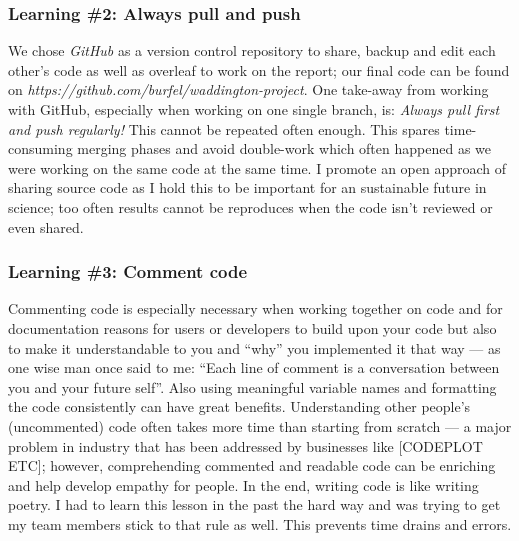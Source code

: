 \documentclass[journal, a4paper]{IEEEtran}
\begin{document}
\subsubsection{Learning \#2: Always pull and push}
We chose \textit{GitHub} as a version control repository to share, backup and edit each other’s code as well as overleaf to work on the report; our final code can be found on \textit{https://github.com/burfel/waddington-project}. One take-away from working with GitHub, especially when working on one single branch, is: \textit{Always pull first and push regularly!} This cannot be repeated often enough. This spares time-consuming merging phases and avoid double-work which often happened as we were working on the same code at the same time. 
I promote an open approach of sharing source code as I hold this to be important for an sustainable future in science; too often results cannot be reproduces when the code isn’t reviewed or even shared.

\hfill
\subsubsection{Learning \#3: Comment code}
Commenting code is especially necessary when working together on code and for documentation reasons for users or developers to build upon your code but also to make it understandable to you and “why” you implemented it that way — as one wise man once said to me: “Each line of comment is a conversation between you and your future self”. Also using meaningful variable names and formatting the code consistently can have great benefits.
Understanding other people’s (uncommented) code often takes more time than starting from scratch — a major problem in industry that has been addressed by businesses like [CODEPLOT ETC]; however, comprehending commented and readable code can be enriching and help develop empathy for people. In the end, writing code is like writing poetry. 
I had to learn this lesson in the past the hard way
and was trying to get my team members stick to that rule as well. This prevents time drains and errors. 

\hfill
\end{document}
